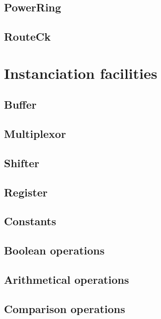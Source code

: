 \documentclass[12pt]{article}
\begin{document}
    \subsection{PowerRing}
    \label{secpowerring}
    
    \subsection{RouteCk}
    \label{secrouteck}
    

\section{Instanciation facilities}
\label{secfacilities}

    \subsection{Buffer}
    \label{secbuff}
    
    \subsection{Multiplexor}
    \label{secmux}
    
    \subsection{Shifter}
    \label{secshift}
    
    \subsection{Register}
    \label{secreg}
        
    \subsection{Constants}
    \label{secconstant}
        
    \subsection{Boolean operations}
    \label{secbool}
    
    \subsection{Arithmetical operations}
    \label{secarithmetic}
    
    \subsection{Comparison operations}
    \label{seccomp}
    
\end{document}
